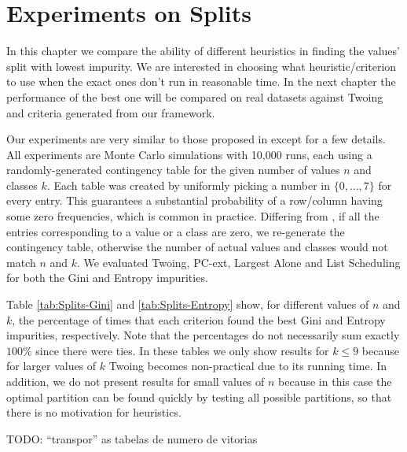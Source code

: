 \newpage

\chapter{Experiments on Splits}
\label{chap:experiments-splits}

In this chapter we compare the ability of different heuristics in finding the values' split with lowest impurity. We are interested in choosing what heuristic/criterion to use when the exact ones don't run in reasonable time. In the next chapter the performance of the best one will be compared on real datasets against Twoing and criteria generated from our framework.

Our experiments are very similar to those proposed in \cite{journals/datamine/CoppersmithHH99} except for a few details. All experiments are Monte Carlo simulations with 10,000 runs, each using a randomly-generated contingency table for the given number of values $n$ and classes $k$. Each table  was created by uniformly picking a number in $\{0, \ldots, 7\}$ for every entry. This guarantees a substantial probability of a row/column having some zero frequencies, which is common in practice. Differing from  \cite{journals/datamine/CoppersmithHH99}, if all the entries corresponding to a value or a class are zero, we re-generate the contingency table, otherwise the number of actual values and classes would not match $n$ and $k$. We evaluated Twoing, PC-ext,
Largest Alone and List Scheduling for both the Gini and Entropy impurities.

Table \ref{tab:Splits-Gini} and \ref{tab:Splits-Entropy} show, for different values of $n$ and $k$, the percentage of times that
each criterion found the best Gini and Entropy impurities, respectively. Note that the percentages do not necessarily sum exactly $100\%$ since
there were ties. In these tables we only show results for $k \leq 9$ because for larger values
of $k$ Twoing becomes non-practical due to its running time. In addition, we do not present results for small values of $n$ because in this
case the optimal  partition can be found quickly by testing all possible partitions, so that there is no motivation for heuristics.

TODO: ``transpor'' as tabelas de numero de vitorias


